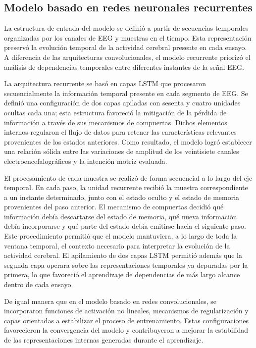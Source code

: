 \subsection{Modelo basado en redes neuronales recurrentes}

La estructura de entrada del modelo se definió a partir de secuencias temporales organizadas por los canales de EEG y muestras en el tiempo. Esta representación preservó la evolución temporal de la actividad cerebral presente en cada ensayo. A diferencia de las arquitecturas convolucionales, el modelo recurrente priorizó el análisis de dependencias temporales entre diferentes instantes de la señal EEG.

La arquitectura recurrente se basó en capas LSTM que procesaron secuencialmente la información temporal presente en cada segmento de EEG. Se definió una configuración de dos capas apiladas con sesenta y cuatro unidades ocultas cada una; esta estructura favoreció la mitigación de la pérdida de información a través de sus mecanismos de compuertas. Dichos elementos internos regularon el flujo de datos para retener las características relevantes provenientes de los estados anteriores. Como resultado, el modelo logró establecer una relación sólida entre las variaciones de amplitud de los veintisiete canales electroencefalográficos y la intención motriz evaluada.

El procesamiento de cada muestra se realizó de forma secuencial a lo largo del eje temporal. En cada paso, la unidad recurrente recibió la muestra correspondiente a un instante determinado, junto con el estado oculto y el estado de memoria provenientes del paso anterior. El mecanismo de compuertas decidió qué información debía descartarse del estado de memoria, qué nueva información debía incorporarse y qué parte del estado debía emitirse hacia el siguiente paso. Este procedimiento permitió que el modelo mantuviera, a lo largo de toda la ventana temporal, el contexto necesario para interpretar la evolución de la actividad cerebral. El apilamiento de dos capas LSTM permitió además que la segunda capa operara sobre las representaciones temporales ya depuradas por la primera, lo que favoreció el aprendizaje de dependencias de más largo alcance dentro de cada ensayo.

De igual manera que en el modelo basado en redes convolucionales, se incorporaron funciones de activación no lineales, mecanismos de regularización y capas orientadas a estabilizar el proceso de entrenamiento. Estas configuraciones favorecieron la convergencia del modelo y contribuyeron a mejorar la estabilidad de las representaciones internas generadas durante el aprendizaje.

